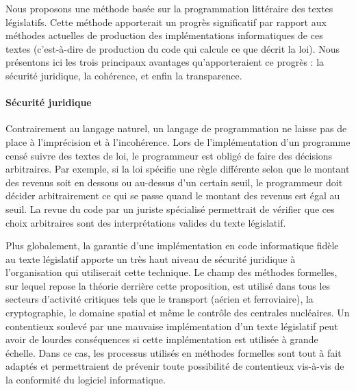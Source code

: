 Nous proposons une méthode basée sur la programmation littéraire des textes législatifs. Cette méthode apporterait un progrès significatif par rapport aux méthodes actuelles de production des implémentations informatiques de ces textes (c'est-à-dire de production du code qui calcule ce que décrit la loi). Nous présentons ici les trois principaux avantages qu'apporteraient ce progrès : la sécurité juridique, la cohérence, et enfin la transparence.

\paragraph{Sécurité juridique} Contrairement au langage naturel, un langage de programmation ne laisse pas de place à l'imprécision et à l'incohérence. Lors de l'implémentation d'un programme censé suivre des textes de loi, le programmeur est obligé de faire des décisions arbitraires. Par exemple, si la loi spécifie une règle différente selon que le montant des revenus soit en dessous ou au-dessus d'un certain seuil, le programmeur doit décider arbitrairement ce qui se passe quand le montant des revenus est égal au seuil. La revue du code par un juriste spécialisé permettrait de vérifier que ces choix arbitraires sont des interprétations valides du texte législatif.

Plus globalement, la garantie d'une implémentation en code informatique fidèle au texte législatif apporte un très haut niveau de sécurité juridique à l'organisation qui utiliserait cette technique. Le champ des méthodes formelles, sur lequel repose la théorie derrière cette proposition, est utilisé dans tous les secteurs d'activité critiques tels que le transport (aérien et ferroviaire), la cryptographie, le domaine spatial et même le contrôle des centrales nucléaires. Un contentieux soulevé par une mauvaise implémentation d'un texte législatif peut avoir de lourdes conséquences si cette implémentation est utilisée à grande échelle. Dans ce cas, les processus utilisés en méthodes formelles sont tout à fait adaptés et permettraient de prévenir toute possibilité de contentieux vis-à-vis de la conformité du logiciel informatique.

